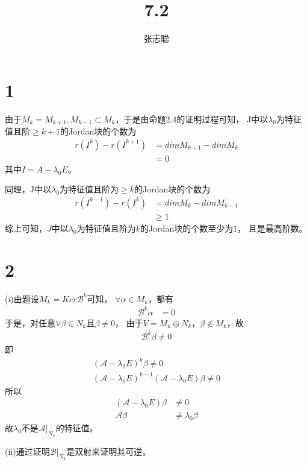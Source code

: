 \documentclass{article}
\begin{document}
\title{7.2}
\author{张志聪}
\maketitle

\section*{1}

由于$M_k = M_{k + 1}, M_{k - 1} \subset M_k$，于是由命题2.4的证明过程可知，
J中以$\lambda_0$为特征值且阶$\geq k + 1$的Jordan块的个数为
\begin{align*}
  r(I^k) - r(I^{k + 1})
   & = dim M_{k + 1} - dim M_{k} \\
   & = 0
\end{align*}
其中$I = A - \lambda_0 E$。

同理，J中以$\lambda_0$为特征值且阶为$\geq k$的Jordan块的个数为
\begin{align*}
  r(I^{k - 1}) - r(I^{k})
   & = dim M_{k} - dim M_{k - 1} \\
   & \geq 1
\end{align*}
综上可知，$J$中以$\lambda_0$为特征值且阶为$k$的Jordan块的个数至少为1，
且是最高阶数。

\section*{2}

 (i)由题设$M_k = Ker \mathscr{B}^k$可知，
$\forall \alpha \in M_k$，都有
\begin{align*}
  \mathscr{B}^k \alpha & = 0
\end{align*}
于是，对任意$\forall \beta \in N_k$且$\beta \neq 0$，
由于$V = M_k \oplus N_k$，$\beta \notin M_k$，故
\begin{align*}
  \mathscr{B}^k \beta \neq 0
\end{align*}
即
\begin{align*}
  (\mathscr{A} - \lambda_0 E)^k \beta \neq 0 \\
  (\mathscr{A} - \lambda_0 E)^{k-1}(\mathscr{A} - \lambda_0 E) \beta \neq 0
\end{align*}
所以
\begin{align*}
  (\mathscr{A} - \lambda_0 E) \beta & \neq 0               \\
  \mathscr{A} \beta                 & \neq \lambda_0 \beta
\end{align*}
故$\lambda_0$不是$\mathscr{A}\big|_{N_k}$的特征值。


(ii)通过证明$\mathscr{B}\big|_{N_k}$是双射来证明其可逆。
\end{document}
